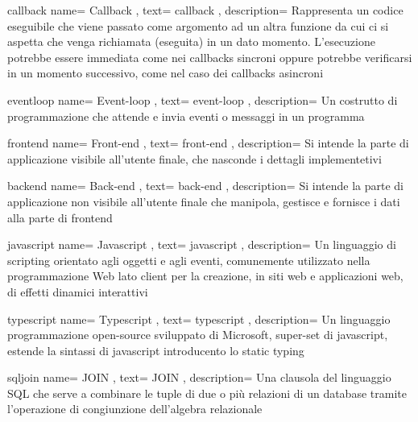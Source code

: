\newglossaryentry
{callback}
{
	name={
		Callback
	},
	text={
		callback
	},
	description={
		Rappresenta un codice eseguibile che viene passato come argomento ad un altra funzione da cui ci si aspetta che venga richiamata (eseguita) in un dato momento. L'esecuzione potrebbe essere immediata come nei callbacks sincroni oppure potrebbe verificarsi in un momento successivo, come nel caso dei callbacks asincroni
	}
}

\newglossaryentry
{eventloop}
{
	name={
		Event-loop
	},
	text={
		event-loop
	},
	description={
		Un costrutto di programmazione che attende e invia eventi o messaggi in un programma
	}
}

\newglossaryentry
{frontend}
{
	name={
		Front-end
	},
	text={
		front-end
	},
	description={
		Si intende la parte di applicazione visibile all'utente finale, che nasconde i dettagli implementetivi
	}
}

\newglossaryentry
{backend}
{
	name={
		Back-end
	},
	text={
		back-end
	},
	description={
		Si intende la parte di applicazione non visibile all'utente finale che manipola, gestisce e fornisce i dati alla parte di \gls{frontend}
	}
}

\newglossaryentry
{javascript}
{
	name={
		Javascript
	},
	text={
		javascript
	},
	description={
		Un linguaggio di scripting orientato agli oggetti e agli eventi, comunemente utilizzato nella programmazione Web lato client per la creazione, in siti web e applicazioni web, di effetti dinamici interattivi
	}
}

\newglossaryentry
{typescript}
{
	name={
		Typescript
	},
	text={
		typescript
	},
	description={
		Un linguaggio programmazione open-source sviluppato di Microsoft, super-set di \gls{javascript}, estende la sintassi di \gls{javascript} introducento lo static typing
	}
}

\newglossaryentry
{sqljoin}
{
name={
	JOIN
},
text={
	JOIN
},
description={
	Una clausola del linguaggio SQL che serve a combinare le tuple di due o più relazioni di un database tramite l'operazione di congiunzione dell'algebra relazionale
}
}